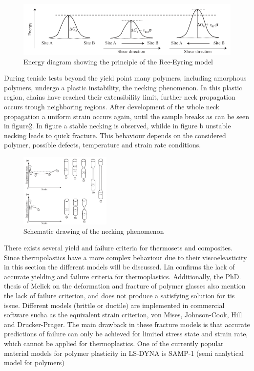 \begin{figure}[H]
    \centering
    \includegraphics[width=0.\textwidth]{chapter_2/figures/Ree-Eyring.png}
    \caption{Energy diagram showing the principle of the Ree-Eyring model \cite{Halary2011PolymerMaterials}}
    \label{fig:Ree-Eyring}
\end{figure}
During tenisle tests beyond the yield point many polymers, including amorphous polymers, undergo a plastic instability, the necking phenomenon. In this plastic region, chains have reached their extensibility limit, further neck propagation occurs trough neighboring regions. After development of the whole neck propagation a uniform strain occurs again, until the sample breaks as can be seen in figure\ref{fig:Necking}. In figure a stable necking is observed, whilde in figure b unstable necking leads to quick fracture. This behaviour depends on the considered polymer, possible defects, temperature and strain rate conditions. 
\begin{figure}[H]
    \centering
    \includegraphics[width=0.4\textwidth]{chapter_2/figures/Necking.png}
    \caption{Schematic drawing of the necking phenomenon \cite{Halary2011PolymerMaterials}}
    \label{fig:Necking}
\end{figure}
There exists several yield and failure criteria for thermosets and composites. Since thermpolastics have a more complex behaviour due to their viscoeleasticity in this section the different models will be discussed. 
Lin\cite{Lin2013StressLoading} confirms the lack of accurate yielding and failure criteria for thermoplastics. Additionally, the PhD. thesis of Melick \cite{Melick2002DeformationGlasses} on the deformation and fracture of polymer glasses also mention the lack of failure criterion, and does not produce a satisfying solution for tis issue. Different  models (brittle or ductile) are implemented in commercial software sucha as the equivalent strain criterion, von Mises, Johnson-Cook, Hill and Drucker-Prager. The main drawback in these fracture models is that accurate predictions of failure can only be achieved for limited stress state and strain rate, which cannot be applied for thermoplastics. One of the currently popular material models for polymer plasticity  in LS-DYNA is SAMP-1 (semi analytical model for polymers)

